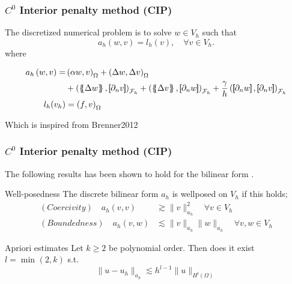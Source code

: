 \begin{frame}
\frametitle{ $C^0$ Interior penalty method (CIP) }

\begin{block}{}
The discretized numerical problem is to solve $w \in V_{h}$ such that
\begin{equation*}
\label{eq:CP_A_F}
a_{h}( w, v )   = l_{h}( v), \quad \forall v \in V_{h}  .
\end{equation*}
where

\begin{equation*}
\begin{split}
a_{h} \left( w, v \right)   =&
    \left( \alpha  w, v \right) _{\Omega }   +  \left( \Delta  w, \Delta v \right) _{\Omega } \\
 & +
  \left( \mean{  \Delta  w }, \jump{ \partial _{n }v} \right)_{\mathcal{F}_{h}}  +
 \left( \mean{ \Delta  v }, \jump{ \partial _{n}w }      \right)_{\mathcal{F}_{h}}  + \frac{\gamma }{h}  \left( \jump{ \partial _{n} w}, \jump{ \partial _{n} v   }   \right)_{\mathcal{F}_{h}} \\
 l_{h}( v_{h}) & =  \left( f, v \right) _{\Omega }
\end{split}
\end{equation*}

Which is inspired from Brenner2012 \footnotemark[1]
\end{block}


\end{frame}

\begin{frame}
    \frametitle{ $C^0$ Interior penalty method (CIP) }
    The following results has been shown to hold for the bilinear form \footnotemark[1].

    \begin{block}{Well-posedness}
         The discrete bilinear form $a_{h}$ is wellposed on $V_{h}$ if this holds; \[
             \begin{split}
                 (Coercivity) \quad  a_{h}( v,v) &  \gtrsim  \| v \|_{a_{h} }^{ 2 } \quad  \forall v \in  V_{h} \\
            (Boundedness) \quad a_{h}( v,w) & \lesssim  \| v \|_{a_{h} }^{  }\| w \|_{a_{h} }^{  } \quad  \forall v,w \in  V_{h}
             \end{split}
        \]
    \end{block}
    \begin{block}{Apriori estimates }
        Let $k\ge 2$ be polynomial order. Then does it exist  $l = \min_{} ( 2, k)  $ s.t.
\[
        \| u - u_{h} \|_{a_{h}  }^{  } \lesssim  h^{l-1} \| u \|_{ H^{l} ( \Omega ) }^{  }
\]
    \end{block}
\end{frame}

